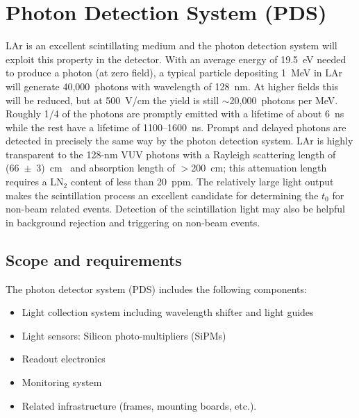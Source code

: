 
\section{Photon Detection System (PDS)}
\label{sec:pd_system}

LAr is an excellent scintillating medium and the photon detection
system will exploit this property in the detector.  With an
average energy of 19.5~eV needed to produce a photon (at zero field),
a typical particle depositing 1~MeV in LAr will generate
40,000~photons with wavelength of 128~nm. At higher fields this will
be reduced, but at 500~V/cm the yield is still $\sim$20,000~photons
per MeV. Roughly 1/4 of the photons are promptly emitted with a
lifetime of about 6~ns while the rest have a lifetime of
1100--1600~ns. Prompt and delayed photons are detected in
  precisely the same way by the photon detection system. LAr is
highly transparent to the 128-nm VUV photons with a Rayleigh
scattering length of (66~$\pm$~3)~cm~\cite{Rayleigh} and absorption
length of $>$200~cm; this attenuation length requires a LN$_2$
  content of less than 20~ppm. The relatively large light output makes
the scintillation process an excellent candidate for determining the
$t_0$ for non-beam related events. Detection of the scintillation
light may also be helpful in background rejection and triggering on
non-beam events.

\subsection{Scope and requirements}

The photon detector system (PDS) 
includes the following components:

\begin{itemize}
\item Light collection system including wavelength shifter and light guides
\item Light sensors: Silicon photo-multipliers (SiPMs)
\item Readout electronics
\item Monitoring system
\item Related infrastructure (frames, mounting boards, etc.).
\end{itemize}


